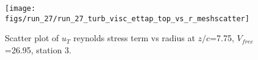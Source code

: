 \begin{figure}[H]
\centering
\texttt{[image: figs/run\_27/run\_27\_turb\_visc\_ettap\_top\_vs\_r\_meshscatter]}
\caption{Scatter plot of $
u_T$ reynolds stress term vs radius at $z/c$=7.75, $V_{free}$=26.95, station 3.}
\label{fig:run_27_turb_visc_ettap_top_vs_r_meshscatter}
\end{figure}


